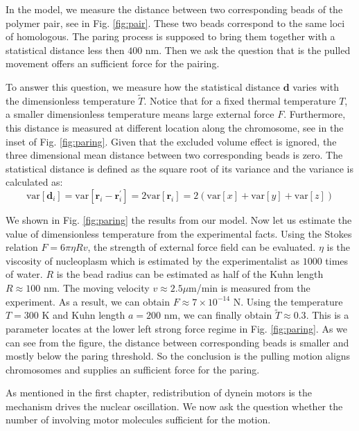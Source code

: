 In the model, we measure the distance between two corresponding beads of the polymer pair, see in Fig. \ref{fig:pair}. These two beads correspond to the same loci of homologous. The paring process is supposed to bring them together with a statistical distance less then $400$ nm. 
Then we ask the question that is the pulled movement offers an sufficient force for the pairing. 

To answer this question, we measure how the statistical distance $\mathbf{d}$ varies with the dimensionless temperature $\tilde{T}$. Notice that for a fixed thermal temperature $T$, a smaller dimensionless temperature means large external force $F$. Furthermore, this distance is measured at different location along the chromosome, see in the inset of Fig. \ref{fig:paring}.  
Given that the excluded volume effect is ignored, the three dimensional mean distance between two corresponding beads is zero. The statistical distance is defined as the square root of its variance and the variance is calculated as:
\begin{equation}
    \label{eq:statisticalDistance}
    \text{var}\left[\mathbf{d}_i\right] = 
    \text{var}\left[\mathbf{r}_i - \mathbf{r}_i^\prime\right] = 2 \text{var}\left[\mathbf{r}_i\right]
    = 2\left( \text{var}\left[x\right] + \text{var}\left[y\right] + \text{var}\left[z\right]\right)
\end{equation}

We shown in Fig. \ref{fig:paring} the results from our model. Now let us estimate the value of dimensionless temperature from the experimental facts. Using the Stokes relation $F = 6\pi\eta R v$, the strength of external force field can be evaluated. $\eta$ is the viscosity of nucleoplasm which is estimated by the experimentalist as $1000$ times of water. $R$ is the bead radius can be estimated as half of the Kuhn length $R \approx 100$ nm. The moving velocity $v \approx 2.5\mu$m/min is measured from the experiment. As a result, we can obtain $F \approx 7\times10^{-14}$ N. Using the temperature $T=300$ K and Kuhn length $a=200$ nm, we can finally obtain $\tilde{T} \approx 0.3$. This is a parameter locates at the lower left strong force regime in Fig. \ref{fig:paring}. As we can see from the figure, the distance between corresponding beads is smaller and mostly below the paring threshold. So the conclusion is the pulling motion aligns chromosomes and supplies an sufficient force for the paring. 

As mentioned in the first chapter, redistribution of dynein motors is the mechanism drives the nuclear oscillation.  We now ask the question whether the number of involving motor molecules sufficient for the motion. 

